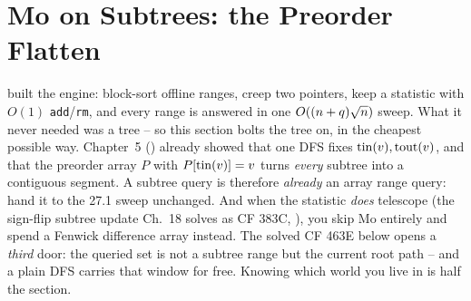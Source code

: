 \section{Mo on Subtrees: the Preorder Flatten}\label{sec:c21-subtree}

\begin{previouslybox}
 built the engine: block-sort offline ranges, creep two
pointers, keep a statistic with \(O(1)\) \texttt{add}/\texttt{rm}, and every
range is answered in one \(O((n+q)\sqrt n)\) sweep.  What it never needed
was a tree -- so this section bolts the tree on, in the cheapest possible way.
Chapter~5 () already showed that one DFS fixes \(\operatorname{tin}(v),\operatorname{tout}(v)\),
and that the preorder array \(P\) with \(P[\operatorname{tin}(v)]=v\) turns \emph{every}
subtree into a contiguous segment.  A subtree query is therefore \emph{already}
an array range query: hand it to the 27.1 sweep unchanged.  And when the
statistic \emph{does} telescope (the sign-flip subtree update Ch.~18 solves as
CF 383C, ), you skip Mo entirely and spend a Fenwick difference
array instead.  The solved CF 463E below opens a \emph{third} door: the queried
set is not a subtree range but the current root path -- and a plain DFS carries
that window for free.  Knowing which world you live in is half the section.
\end{previouslybox}

